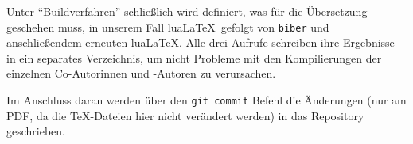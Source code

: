 Unter \enquote{Buildverfahren} schließlich wird definiert, was für die Übersetzung geschehen muss, in unserem Fall lua\LaTeX\ gefolgt von \texttt{biber} und anschließendem erneuten lua\LaTeX. Alle drei Aufrufe schreiben ihre Ergebnisse in ein separates Verzeichnis, um nicht Probleme mit den Kompilierungen der einzelnen Co-Autorinnen und -Autoren zu verursachen.

Im Anschluss daran werden über den \texttt{git commit} Befehl die Änderungen (nur am PDF, da die \TeX-Dateien hier nicht verändert werden) in das Repository geschrieben.


